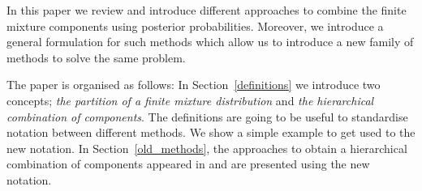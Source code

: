 \documentclass[10pt, a4paper]{article}
\newtheorem{prob}{Problem}
\begin{document}
In this paper we review and introduce different approaches to combine the finite mixture components using posterior probabilities. Moreover, we introduce a general formulation for such methods which allow us to introduce a new family of methods to solve the same problem.

The paper is organised as follows: In Section~\ref{definitions} we introduce two concepts; \emph{the partition of a finite mixture distribution} and \emph{the hierarchical combination of components}. The definitions are going to be useful to standardise notation between different methods. We show a simple example to get used to the new notation. In Section~\ref{old_methods}, the approaches to obtain a hierarchical combination of components appeared in \cite{hennig2010methods} and \cite{baudry2010combining} are presented using the new notation. 








% 
%
\end{document}
